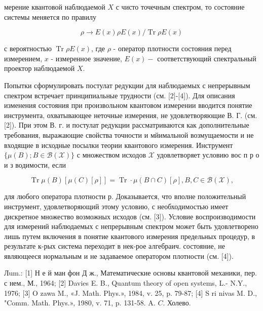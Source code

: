 \documentclass[10pt]{article}
\begin{document}
мерение квантовой наблюдаемой $X$ с чисто точечным спектром, то состояние системы меняется по правилу



\[

\rho \rightarrow E(x) \rho E(x) / \operatorname{Tr} \rho E(x)

\]



с вероятностью $\operatorname{Tr} \rho E(x)$, где $\rho$ - оператор плотности состояния перед измерением, $x$ - измеренное значение, $E(x)-$ соответствующий спектральный проектор наблюдаемой $X$.



Попытки сформулировать постулат редукции для наблюдаемых с непрерывным спектром встречает принципиальные трудности (см. [2]-[4]). Для описания изменения состояния при произвольном квантовом измерении вводится понятие инструмента, охватывающее неточные измерения, не удовлетворяющие В. Г. (см. [2]). При этом В. г. и постулат редукции рассматриваются как дополнительные требования, выражающие свойства точности и мйимальной возмущаемости и не входящие в исходные посылки теории квантового измерения. Инструмент $\{\mathscr{\mu}(B) ; B \in \mathscr{B}(\mathscr{X})\}$ с множеством исходов $\mathscr{X}$ удовлетворяет условию вос п р о и з водимости, если



\[

\operatorname{Tr} \mathscr{\mu}(B)[\mu(C)[\rho]]=\operatorname{Tr} \cdot \mu(B \cap C)[\rho], B, C \in \mathscr{B}(\mathscr{X}),

\]



для любого оператора плотности р. Доказывается, что вполне положительный инструмент, удовлетворяющий этому условию, с необходимостью имеет дискретное множество возможных исходов (см. [3]). Условие воспроизводимости для измерений наблюдаемых с непрерывным спектром может быть удовлетворено лишь путем включения в понятие квантового измерения предельных процедур, в результате к-рых система переходит в нек-рое алгебраич. состояние, не являющееся нормальным и не задаваемое оператором плотности (см. [4]).



Лum.: [1] Н е й ман фон Д ж., Математические основы квантовой механики, пер. с нем., М., 1964; [2] Davies E. B., Quantum theory of open systems, L.- N.Y., 1976; [3] O zawa M., «J. Math. Phys.», 1984, v. 25, p. 79-87; [4] S ri nivas M. D., "Comm. Math. Phys.», 1980, v. 71, p. 131-58. A. $C$. Холево.
\end{document}
